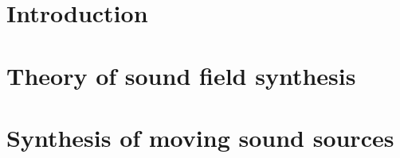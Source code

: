 \documentclass[%
	paper=A4,					%
	twoside=true,				%
	openright,					%
	chapterprefix=true,			%
	11pt,						%
	headings=normal,			%
	bibliography=totoc,			%
	listof=totoc,				%
	titlepage=on,				%
	captions=tableabove,		%
	draft=false,				%
]{scrreprt}
\begin{document}
\EveryShipout{%
  \ifthenelse{\isodd{\value{page}}}%
    {\global\marginparsep=20pt}%
    {\global\marginparsep=5pt}%
}



\pagestyle{empty}				%
\cleardoublepage



\cleardoublepage

\pagestyle{plain}				%
\setcounter{tocdepth}{2}		%
\tableofcontents				%
\cleardoublepage
{}			%
\setcounter{page}{1}			%
\pagestyle{maincontentstyle} 	%

%

\chapter{Introduction}
\label{sec:introduction}


%
%
%
%
\chapter{Theory of sound field synthesis}
\label{sec:sound_field_synthesis}


\chapter{Synthesis of moving sound sources}
\label{sec:moving_source_synthesis}

\end{document}
